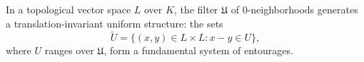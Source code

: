 In a topological vector space $L$ over $K$, the filter $\mathfrak{U}$ of 0-neighborhoods generates a translation-invariant uniform structure: the sets
$$\tilde{U} = \{(x, y) \in L \times L : x - y \in U\},$$
where $U$ ranges over $\mathfrak{U}$, form a fundamental system of entourages.
